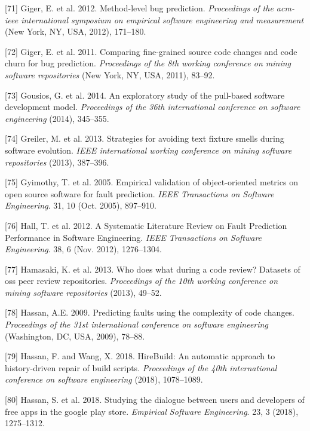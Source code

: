 \documentclass[]{book}
\begin{document}
\hypertarget{ref-giger2012}{}
{[}71{]} Giger, E. et al. 2012. Method-level bug prediction.
\emph{Proceedings of the acm-ieee international symposium on empirical
software engineering and measurement} (New York, NY, USA, 2012),
171--180.

\hypertarget{ref-Giger2011}{}
{[}72{]} Giger, E. et al. 2011. Comparing fine-grained source code
changes and code churn for bug prediction. \emph{Proceedings of the 8th
working conference on mining software repositories} (New York, NY, USA,
2011), 83--92.

\hypertarget{ref-gousios2014exploratory}{}
{[}73{]} Gousios, G. et al. 2014. An exploratory study of the pull-based
software development model. \emph{Proceedings of the 36th international
conference on software engineering} (2014), 345--355.

\hypertarget{ref-greiler2013}{}
{[}74{]} Greiler, M. et al. 2013. Strategies for avoiding text fixture
smells during software evolution. \emph{IEEE international working
conference on mining software repositories} (2013), 387--396.

\hypertarget{ref-Gyimothy2005}{}
{[}75{]} Gyimothy, T. et al. 2005. Empirical validation of
object-oriented metrics on open source software for fault prediction.
\emph{IEEE Transactions on Software Engineering}. 31, 10 (Oct. 2005),
897--910.

\hypertarget{ref-Hall2012}{}
{[}76{]} Hall, T. et al. 2012. A Systematic Literature Review on Fault
Prediction Performance in Software Engineering. \emph{IEEE Transactions
on Software Engineering}. 38, 6 (Nov. 2012), 1276--1304.

\hypertarget{ref-hamasaki2013does}{}
{[}77{]} Hamasaki, K. et al. 2013. Who does what during a code review?
Datasets of oss peer review repositories. \emph{Proceedings of the 10th
working conference on mining software repositories} (2013), 49--52.

\hypertarget{ref-hassan2009}{}
{[}78{]} Hassan, A.E. 2009. Predicting faults using the complexity of
code changes. \emph{Proceedings of the 31st international conference on
software engineering} (Washington, DC, USA, 2009), 78--88.

\hypertarget{ref-hassan2018hirebuild}{}
{[}79{]} Hassan, F. and Wang, X. 2018. HireBuild: An automatic approach
to history-driven repair of build scripts. \emph{Proceedings of the 40th
international conference on software engineering} (2018), 1078--1089.

\hypertarget{ref-hassan2018studying}{}
{[}80{]} Hassan, S. et al. 2018. Studying the dialogue between users and
developers of free apps in the google play store. \emph{Empirical
Software Engineering}. 23, 3 (2018), 1275--1312.
\end{document}

